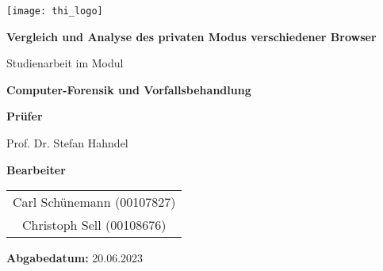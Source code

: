 


\thispagestyle{empty}

\begin{center}
	\texttt{[image: thi\_logo]}
\end{center}

\vspace{1.2cm}

\begin{center}
	{\huge \textbf{Vergleich und Analyse des privaten Modus verschiedener Browser}}
\end{center}

\vspace{1.2cm}

\begin{center}{\Large Studienarbeit im Modul}\end{center}
\begin{center}{\Large \textbf{Computer-Forensik und Vorfallsbehandlung}}\end{center}

\vspace{0.6cm}

\begin{center}{\Large \textbf{Prüfer}}\end{center}
\begin{center}{\Large Prof. Dr. Stefan Hahndel}\end{center}
	
\vspace{0.6cm}

\begin{center}{\Large \textbf{Bearbeiter}}\end{center}
\begin{center}
	\begin{Large}
		\begin{tabular}{c}
			Carl Schünemann	(00107827) 								\tabularnewline
			Christoph Sell	(00108676)									\tabularnewline
		\end{tabular}
	\end{Large}
\end{center}

\vspace{0.6cm}

\begin{center}{\Large \textbf{Abgabedatum:} 20.06.2023}\end{center}

